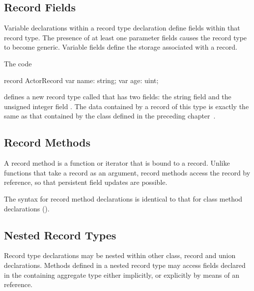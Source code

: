 \subsection{Record Fields}
\label{Record_Fields}

Variable declarations within a record type declaration define fields within that
record type.  The presence of at least one parameter fields causes the record
type to become generic.  Variable fields define the storage associated with a
record.

\begin{example}
The code
\begin{chapelpre}
\end{chapelpre}
\begin{chapel}
record ActorRecord {
  var name: string;
  var age: uint;
}
\end{chapel}
\begin{chapeloutput}
\end{chapeloutput}
defines a new record type called  that has two fields: the
string field  and the unsigned integer field .  The data
contained by a record of this type is exactly the same as that contained by
the  class defined in the preceding chapter~.
\end{example}

\subsection{Record Methods}
\label{Record_Methods}

A record method is a function or iterator that is bound to a record.  Unlike
functions that take a record as an argument, record methods access the record by
reference, so that persistent field updates are possible.

The syntax for record method declarations is identical to that for class method
declarations ().

\subsection{Nested Record Types}
\label{Nested_Record_Types}

Record type declarations may be nested within other class, record and union
declarations.  Methods defined in a nested record type may access fields
declared in the containing aggregate type either implicitly, or explicitly by
means of an  reference.

